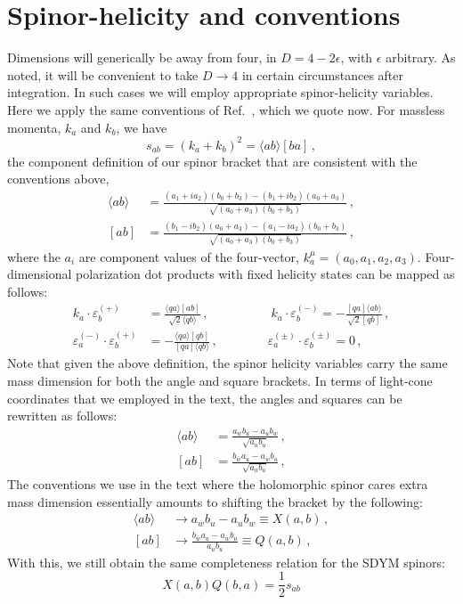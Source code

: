 \documentclass[11pt,letter]{article}
\def\be{\begin{equation}}
\def\ee{\end{equation}}
\begin{document}
\section{Spinor-helicity and conventions}
Dimensions will generically be away from four, in $D=4-2\epsilon$, with $\epsilon$ arbitrary. As noted, it will be convenient to take $D\rightarrow 4$ in certain circumstances after integration.  In such cases we will employ appropriate spinor-helicity variables.  Here we apply the same conventions of Ref.~\cite{jjmcTASI2014}, which we quote now. For massless momenta, $k_a$ and $k_b$, we have 
\begin{equation}
s_{ab} = (k_a+k_b)^2= \langle ab \rangle[ba]\,,
\end{equation}
the component definition of our spinor bracket that are consistent with the conventions above,
\begin{align}
\langle ab \rangle &= \frac{(a_1 + i a_2)(b_0+b_3)-(b_1 + i b_2)(a_0+a_3)}{\sqrt{(a_0+a_3)(b_0+b_3)}}\,,
\\
[ab] &= \frac{(b_1 - i b_2)(a_0+a_3)-(a_1 - i a_2)(b_0+b_3)}{\sqrt{(a_0+a_3)(b_0+b_3)}}\,,
\end{align}
where the $a_i$ are component values of the four-vector, $k^\mu_a = (a_0,a_1,a_2,a_3)$. Four-dimensional polarization dot products with fixed helicity states can be mapped as follows:
\begin{equation}\label{eq:4DPols}
\begin{aligned}
k_a \cdot \varepsilon_b^{(+)} &= \frac{\langle q a \rangle[ab]}{\sqrt{2}\langle q b\rangle}\,,
\qquad\quad \qquad
k_a \cdot \varepsilon_b^{(-)} = -\frac{[qa]\langle ab\rangle}{\sqrt{2}[qb]}\,,
\\
\varepsilon_a^{(-)}\cdot \varepsilon_b^{(+)} &= - \frac{\langle q a\rangle [qb]}{ [qa]\langle q b\rangle} \,,
\qquad \qquad
\varepsilon_a^{(\pm)}\cdot \varepsilon_b^{(\pm)} = 0 \,,
\end{aligned}
\end{equation}
Note that given the above definition, the spinor helicity variables carry the same mass dimension for both the angle and square brackets. In terms of light-cone coordinates that we employed in the text, the angles and squares can be rewritten as follows:
\begin{align}
\langle ab \rangle &= \frac{a_w b_u-a_u b_w}{\sqrt{a_ub_u}}\,,
\\
[ab] &= \frac{b_{\bar{w}}a_u-a_{\bar{w}}b_u}{\sqrt{a_ub_u}}\,,
\end{align}
The conventions we use in the text where the holomorphic spinor cares extra mass dimension essentially amounts to shifting the bracket by the following:
\begin{align}
\langle ab \rangle &\rightarrow a_w b_u-a_u b_w \equiv X(a,b)\,,
\\
[ab] &\rightarrow \frac{b_{\bar{w}}a_u-a_{\bar{w}}b_u}{a_ub_u}\equiv Q(a,b)\,,
\end{align}
With this, we still obtain the same completeness relation for the SDYM spinors:
\be
X(a,b)Q(b,a) = \frac{1}{2}s_{ab}
\ee
\end{document}
